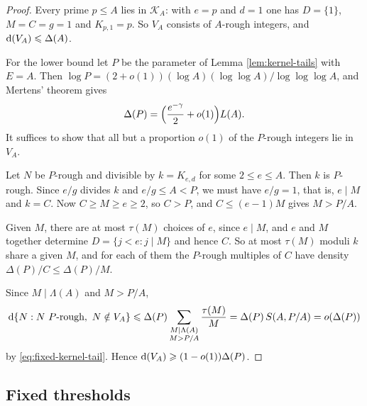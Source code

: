\documentclass[11pt,letterpaper,reqno]{amsart}
\numberwithin{equation}{section}
\theoremstyle{remark}
\renewcommand{\leq}{\leqslant}
\renewcommand{\geq}{\geqslant}
\begin{document}
\begin{proof}
Every prime $p\leq A$ lies in $\mathcal{K}_A$: with $e=p$ and $d=1$ one has
$D=\{1\}$, $M=C=g=1$ and $K_{p,1}=p$. So $V_A$ consists of $A$-rough
integers, and $\textup{d}(V_A)\leq\Delta(A)$.

For the lower bound let $P$ be the parameter of
Lemma \ref{lem:kernel-tails} with $E=A$. Then
$\log P=(2+o(1))(\log A)(\log\log A)/\log\log\log A$, and Mertens' theorem gives
\[
 \Delta(P)=\Bigl(\frac{e^{-\gamma}}2+o(1)\Bigr)L(A).
\]
It suffices to show that all but a proportion $o(1)$ of the $P$-rough
integers lie in $V_A$.

Let $N$ be $P$-rough and divisible by $k=K_{e,d}$ for some $2\leq e\leq A$.
Then $k$ is $P$-rough. Since $e/g$ divides $k$ and $e/g\leq A<P$, we must
have $e/g=1$, that is, $e\mid M$ and $k=C$. Now $C\geq M\geq e\geq2$, so
$C>P$, and $C\leq(e-1)M$ gives $M>P/A$.

Given $M$, there are at most $\tau(M)$ choices of $e$, since $e\mid M$, and
$e$ and $M$ together determine $D=\{j<e:j\mid M\}$ and hence $C$. So at
most $\tau(M)$ moduli $k$ share a given $M$, and for each of them the
$P$-rough multiples of $C$ have density $\Delta(P)/C\leq\Delta(P)/M$.

Since $M\mid\Lambda(A)$ and $M>P/A$,
\[
 \textup{d}\{N:N\ \text{$P$-rough},\ N\notin V_A\}
 \leq\Delta(P)\sum_{\substack{M\mid\Lambda(A)\\ M>P/A}}\frac{\tau(M)}M
 =\Delta(P)\,S(A,P/A)=o(\Delta(P))
\]
by \eqref{eq:fixed-kernel-tail}. Hence $\textup{d}(V_A)\geq(1-o(1))\Delta(P)$.
\end{proof}

\subsection{Fixed thresholds}
\end{document}
